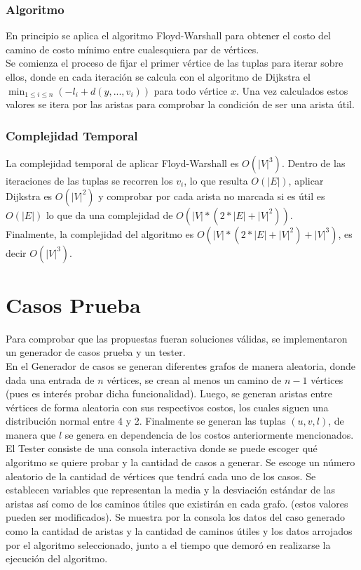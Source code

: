 \documentclass{article}
\begin{document}
\subsubsection{Algoritmo}
En principio se aplica el algoritmo Floyd-Warshall para obtener el costo del camino de costo mínimo entre cualesquiera par de vértices.
\\
Se comienza el proceso de fijar el primer vértice de las tuplas para iterar sobre ellos, donde en cada iteración se calcula con el algoritmo de Dijkstra el $\min_{1 \leq i \leq n} (-l_i + d(y,...,v_i))$ para todo vértice $x$. Una vez calculados estos valores se itera por las aristas para comprobar la condición de ser una arista útil.

\subsubsection{Complejidad Temporal}
La complejidad temporal de aplicar Floyd-Warshall es $O(|V|^3)$. Dentro de las iteraciones de las tuplas se recorren los $v_i$, lo que resulta $O(|E|)$, aplicar Dijkstra es $O(|V|^2)$ y comprobar por cada arista no marcada si es útil es $O(|E|)$ lo que da una complejidad de $O(|V|*(2*|E| + |V|^2))$.
\\
Finalmente, la complejidad del algoritmo es $O(|V|*(2*|E| + |V|^2) + |V|^3)$, es decir $O(|V|^3)$.

\section{Casos Prueba}

Para comprobar que las propuestas fueran soluciones válidas, se implementaron un generador de casos prueba y un tester.
\\
En el Generador de casos se generan diferentes grafos de manera aleatoria, donde dada una entrada de $n$ vértices, se crean al menos un camino de $n-1$ vértices (pues es interés probar dicha funcionalidad). Luego, se generan aristas entre vértices de forma aleatoria con sus respectivos costos, los cuales siguen una distribución normal entre 4 y 2. Finalmente se generan las tuplas $(u,v,l)$, de manera que $l$ se genera en dependencia de los costos anteriormente mencionados.
\\
El Tester consiste de una consola interactiva donde se puede escoger qué algoritmo se quiere probar y la cantidad de casos a generar. Se escoge un número aleatorio de la cantidad de vértices que tendrá cada uno de los casos. Se establecen variables que representan la media y la desviación estándar de las aristas así como de los caminos útiles que existirán en cada grafo. (estos valores pueden ser modificados). Se muestra por la consola los datos del caso generado como la cantidad de aristas y la cantidad de caminos útiles y los datos arrojados por el algoritmo seleccionado, junto a el tiempo que demoró en realizarse la ejecución del algoritmo.
\end{document}
